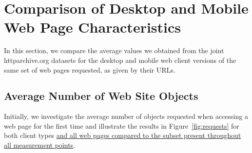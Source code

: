 \documentclass[onecolumn,12pt]{IEEEtran}
\begin{document}
\section{Comparison of Desktop and Mobile Web Page Characteristics}
\label{s:compare}
In this section, we compare the average values we obtained from the joint httparchive.org datasets for the desktop and mobile web client versions of the same set of web pages requested, as given by their URLs.

\subsection{Average Number of Web Site Objects}
\label{ss:objects}
Initially, we investigate the average number of objects requested when accessing a web page for the first time and illustrate the results in Figure~\ref{fig:requests} for both client types \uline{and all web pages compared to the subset present throughout all measurement points}.
\end{document}
